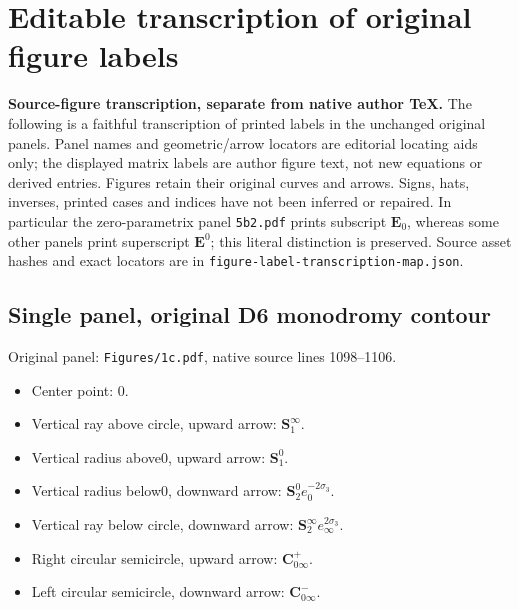 \documentclass[11pt]{article}
\numberwithin{equation}{section}
\numberwithin{equation}{section}
\begin{document}
\clearpage
\section*{Editable transcription of original figure labels}
\noindent\textbf{Source-figure transcription, separate from native author TeX.} The following is a faithful transcription of printed labels in the unchanged original panels. Panel names and geometric/arrow locators are editorial locating aids only; the displayed matrix labels are author figure text, not new equations or derived entries. Figures retain their original curves and arrows. Signs, hats, inverses, printed cases and indices have not been inferred or repaired. In particular the zero-parametrix panel \texttt{5b2.pdf} prints subscript $\mathbf{E}_0$, whereas some other panels print superscript $\mathbf{E}^{0}$; this literal distinction is preserved. Source asset hashes and exact locators are in \texttt{figure-label-transcription-map.json}.

\subsection*{Single panel, original D6 monodromy contour}
\noindent Original panel: \texttt{Figures/1c.pdf}, native source lines 1098--1106.
\begin{itemize}\itemsep=0pt
\item Center point: $0$.
\item Vertical ray above circle, upward arrow: $\mathbf{S}_1^\infty{}$.
\item Vertical radius above0, upward arrow: $\mathbf{S}_1^0{}$.
\item Vertical radius below0, downward arrow: $\mathbf{S}_2^0{}e_0^{-2\sigma_3}$.
\item Vertical ray below circle, downward arrow: $\mathbf{S}_2^\infty{}e_\infty^{2\sigma_3}$.
\item Right circular semicircle, upward arrow: $\mathbf{C}_{0\infty}^{+}{}$.
\item Left circular semicircle, downward arrow: $\mathbf{C}_{0\infty}^{-}{}$.
\end{itemize}
\end{document}
